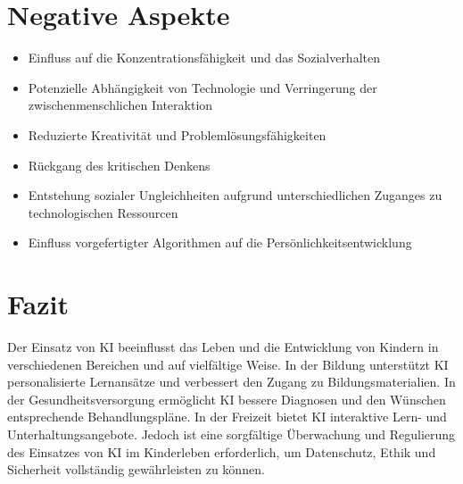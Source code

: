 \documentclass{report}
\begin{document}
\section{Negative Aspekte}

\begin{itemize}

    \item Einfluss auf die Konzentrationsfähigkeit und das Sozialverhalten
    \item Potenzielle Abhängigkeit von Technologie und Verringerung der zwischenmenschlichen Interaktion
    \item Reduzierte Kreativität und Problemlösungsfähigkeiten
    \item Rückgang des kritischen Denkens
    \item Entstehung sozialer Ungleichheiten aufgrund unterschiedlichen Zuganges zu technologischen Ressourcen
    \item Einfluss vorgefertigter Algorithmen auf die Persönlichkeitsentwicklung

\end{itemize}

\section{Fazit}

Der Einsatz von KI beeinflusst das Leben und die Entwicklung von Kindern in verschiedenen Bereichen und auf vielfältige Weise. In der Bildung unterstützt KI personalisierte Lernansätze und verbessert den Zugang zu Bildungsmaterialien. In der Gesundheitsversorgung ermöglicht KI bessere Diagnosen und den Wünschen entsprechende Behandlungspläne. In der Freizeit bietet KI interaktive Lern- und Unterhaltungsangebote. 
Jedoch ist eine sorgfältige Überwachung und Regulierung des Einsatzes von KI im Kinderleben erforderlich, um Datenschutz, Ethik und Sicherheit vollständig gewährleisten zu können. 



\printbibliography
\end{document}

